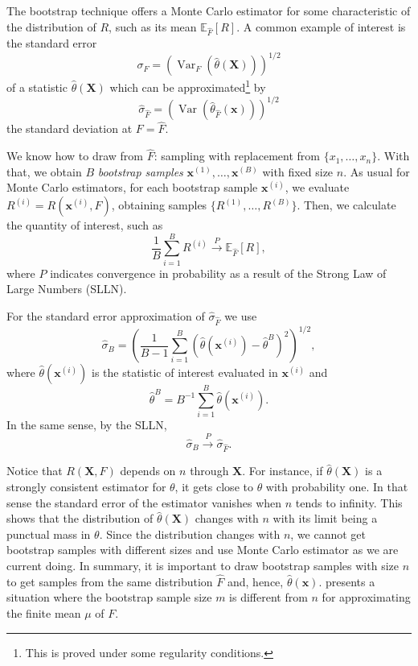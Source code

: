 \documentclass[a4paper,10pt, notitlepage]{report}
\newcommand{\ev}{\mathbb{E}}
\newcommand{\var}{\operatorname{Var}}
\begin{document}
The bootstrap technique offers a 
Monte Carlo estimator for some characteristic of the distribution of $R$, such
as its mean $\ev_{\hat{F}}[R]$. A common example of interest is the 
standard error 
$$\sigma_F = \left(\var_F(\hat{\theta}(\boldsymbol{X}))\right)^{1/2}$$
of a statistic $\hat{\theta}(\boldsymbol{X})$ 
which can be approximated\footnote{This is proved under some regularity conditions.} by 
$$
\hat{\sigma}_{\hat{F}} = \left(\var(\hat{\theta}_
{\hat{F}}(\boldsymbol{x}))\right)^{1/2}
$$
the standard deviation at $F = \hat{F}$. 

We know how to draw from $\hat{F}$: sampling with replacement from $\{x_1, \dots, x_n\}
$. With that, we obtain $B$ {\em bootstrap samples} $\boldsymbol{x}^{(1)},
\dots, \boldsymbol{x}^{(B)}$ with fixed size $n$. As usual for Monte Carlo estimators, for each bootstrap sample
$\boldsymbol{x}^{(i)}$, we evaluate $R^{(i)} = R(\boldsymbol{x}^{(i)},
\hat{F})$, obtaining samples $\{R^{(1)}, \dots, R^{(B)}\}$. Then, we calculate
the quantity of interest, such as 
$$
\frac{1}{B}\sum_{i=1}^B R^{(i)} \overset{P}{\to} \ev_{\hat{F}}[R], 
$$
where $P$ indicates convergence in probability as a result of the Strong Law
of Large Numbers (SLLN). 

For the standard error approximation of $\hat{\sigma}_{\hat{F}}$ we use 
$$
\hat{\sigma}_B = \left(\frac{1}{B-1}\sum_{i=1}^B (\hat{\theta}(\boldsymbol{x}^{(i)}) - \hat{\theta}^B)^2\right)^{1/2},
$$
where $\hat{\theta}(\boldsymbol{x}^{(i)})$ is the statistic of interest evaluated in
$\boldsymbol{x}^{(i)}$ and 
$$\hat{\theta}^B = B^{-1}\sum_{i=1}^B
\hat{\theta}(\boldsymbol{x}^{(i)}).$$ 
In the same sense, by the SLLN, 
$$
\hat{\sigma}_B \overset{P}{\to} \hat{\sigma}_{\hat{F}}.
$$

Notice that $R(\boldsymbol{X}, F)$ depends on $n$ through $\boldsymbol{X}$.
For instance, if $\hat{\theta}(\boldsymbol{X})$ is a strongly consistent estimator for
$\theta$, it gets close to $\theta$ with probability one. In that sense the
standard error of the estimator vanishes when $n$ tends to infinity. This
shows that the distribution of $\hat{\theta}(\boldsymbol{X})$ changes with
$n$ with its limit being a punctual mass in $\theta$. Since the distribution
changes with $n$, we cannot get bootstrap samples with different sizes and use
Monte Carlo estimator as we are current doing. In summary, it is important to
draw bootstrap samples with size $n$ to get samples from the same
distribution $\hat{F}$ and, hence, $\hat{\theta}(\boldsymbol{x})$.
\cite{bickel1981some} presents a situation where the bootstrap sample size $m$
is different from $n$ for approximating the finite mean $\mu$ of $F$. 
\end{document}

